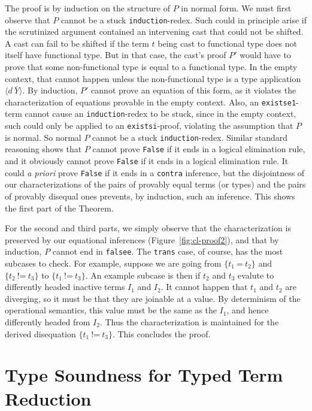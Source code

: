 \documentclass{fundam}
\newcommand{\Eq}[0]{\texttt{=}}
\newcommand{\Neq}[0]{\texttt{!=}}
\begin{document}
The proof is by induction on the structure of $P$ in normal form.  We
must first observe that $P$ cannot be a stuck
\texttt{induction}-redex.  Such could in principle arise if the
scrutinized argument contained an intervening cast that could not be
shifted.  A cast can fail to be shifted if the term $t$ being cast to
functional type does not itself have functional type.  But in that
case, the cast's proof $P'$ would have to prove that some
non-functional type is equal to a functional type.  In the empty
context, that cannot happen unless the non-functional type is a type
application $\langle d\ \bar{Y}\rangle$.  By induction, $P'$ cannot
prove an equation of this form, as it violates the characterization of
equations provable in the empty context.  Also, an
\texttt{existse1}-term cannot cause an \texttt{induction}-redex to be
stuck, since in the empty context, such could only be applied to an
\texttt{existsi}-proof, violating the assumption that $P$ is normal.
So normal $P$ cannot be a stuck \texttt{induction}-redex.  Similar
standard reasoning shows that $P$ cannot prove \texttt{False} if it
ends in a logical elimination rule, and it obviously cannot prove
\texttt{False} if it ends in a logical elimination rule.  It could
\emph{a priori} prove \texttt{False} if it ends in a \texttt{contra}
inference, but the disjointness of our characterizations of the pairs
of provably equal terms (or types) and the pairs of provably disequal
ones prevents, by induction, such an inference.  This shows the first
part of the Theorem.

For the second and third parts, we simply observe that the
characterization is preserved by our equational inferences
(Figure~\ref{fig:cl-proof2}), and that by induction, $P$ cannot end in
\texttt{falsee}.  The \texttt{trans} case, of course, has the most
subcases to check.  For example, suppose we are going from $\{ t_1\
\Eq\ t_2\}$ and $\{t_2\ \Neq\ t_3\}$ to $\{t_1\ \Neq\ t_3\}$.  An
example subcase is then if $t_2$ and $t_3$ evalute to differently
headed inactive terms $I_1$ and $I_2$.  It cannot happen that $t_1$
and $t_2$ are diverging, so it must be that they are joinable at a
value.  By determinism of the operational semantics, this value must
be the same as the $I_1$, and hence differently headed from $I_2$.
Thus the characterization is maintained for the derived disequation
$\{ t_1\ \Neq\ t_3\}$.  This concludes the proof.

\section{Type Soundness for Typed Term Reduction}
\end{document}
